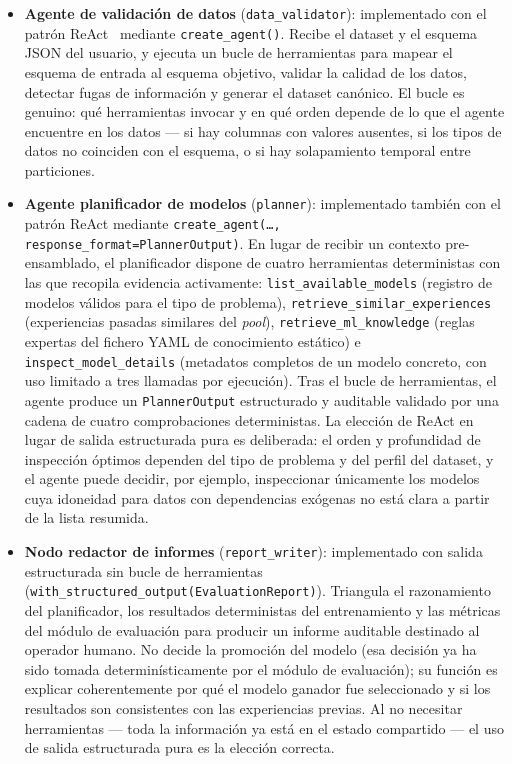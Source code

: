 \begin{itemize}
  \item \textbf{Agente de validación de datos} (\texttt{data\_validator}): implementado con el patrón ReAct~\cite{yao_react} mediante \texttt{create\_agent()}. Recibe el dataset y el esquema JSON del usuario, y ejecuta un bucle de herramientas para mapear el esquema de entrada al esquema objetivo, validar la calidad de los datos, detectar fugas de información y generar el dataset canónico. El bucle es genuino: qué herramientas invocar y en qué orden depende de lo que el agente encuentre en los datos --- si hay columnas con valores ausentes, si los tipos de datos no coinciden con el esquema, o si hay solapamiento temporal entre particiones.

  \item \textbf{Agente planificador de modelos} (\texttt{planner}): implementado también con el patrón ReAct mediante \texttt{create\_agent(\ldots, response\_format=PlannerOutput)}. En lugar de recibir un contexto pre-ensamblado, el planificador dispone de cuatro herramientas deterministas con las que recopila evidencia activamente: \texttt{list\_available\_models} (registro de modelos válidos para el tipo de problema), \texttt{retrieve\_similar\_experiences} (experiencias pasadas similares del \emph{pool}), \texttt{retrieve\_ml\_knowledge} (reglas expertas del fichero YAML de conocimiento estático) e \texttt{inspect\_model\_details} (metadatos completos de un modelo concreto, con uso limitado a tres llamadas por ejecución). Tras el bucle de herramientas, el agente produce un \texttt{PlannerOutput} estructurado y auditable validado por una cadena de cuatro comprobaciones deterministas. La elección de ReAct en lugar de salida estructurada pura es deliberada: el orden y profundidad de inspección óptimos dependen del tipo de problema y del perfil del dataset, y el agente puede decidir, por ejemplo, inspeccionar únicamente los modelos cuya idoneidad para datos con dependencias exógenas no está clara a partir de la lista resumida.

  \item \textbf{Nodo redactor de informes} (\texttt{report\_writer}): implementado con salida estructurada sin bucle de herramientas (\texttt{with\_structured\_output(EvaluationReport)}). Triangula el razonamiento del planificador, los resultados deterministas del entrenamiento y las métricas del módulo de evaluación para producir un informe auditable destinado al operador humano. No decide la promoción del modelo (esa decisión ya ha sido tomada determinísticamente por el módulo de evaluación); su función es explicar coherentemente por qué el modelo ganador fue seleccionado y si los resultados son consistentes con las experiencias previas. Al no necesitar herramientas --- toda la información ya está en el estado compartido --- el uso de salida estructurada pura es la elección correcta.
\end{itemize}


